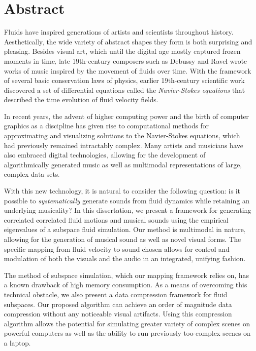 \chapter*{Abstract}
Fluids have inspired generations of artists and scientists throughout history. Aesthetically, the wide variety of abstract shapes they form is both surprising and pleasing. Besides visual art, which until the digital age mostly captured frozen moments in time, late 19th-century composers such as Debussy and Ravel wrote works of music inspired by the movement of fluids over time. With the framework of several basic conservation laws of physics, earlier 19th-century scientific work discovered a set of differential equations called the {\em Navier-Stokes equations} that described the time evolution of fluid velocity fields. 

In recent years, the advent of higher computing power and the birth of computer graphics as a discipline has given rise to computational methods for approximating and visualizing solutions to the Navier-Stokes equations, which had previously remained intractably complex. Many artists and musicians have also embraced digital technologies, allowing for the development of algorithmically generated music as well as multimodal representations of large, complex data sets. 

With this new technology, it is natural to consider the following question: is it possible to {\em systematically} generate sounds from fluid dynamics while retaining an underlying musicality? In this dissertation, we present a framework for generating correlated correlated fluid motions and musical sounds using the empirical eigenvalues of a subspace fluid simulation. Our method is multimodal in nature, allowing for the generation of musical sound as well as novel visual forms. The specific mapping from fluid velocity to sound chosen allows for control and modulation of both the visuals and the audio in an integrated, unifying fashion.

The method of subspace simulation, which our mapping framework relies on, has a known drawback of high memory consumption. As a means of overcoming this technical obstacle, we also present a data compression framework for fluid subspaces. Our proposed algorithm can achieve an order of magnitude data compression without any noticeable visual artifacts. Using this compression algorithm allows the potential for simulating  greater variety of complex scenes on powerful computers as well as the ability to run previously too-complex scenes on a laptop.